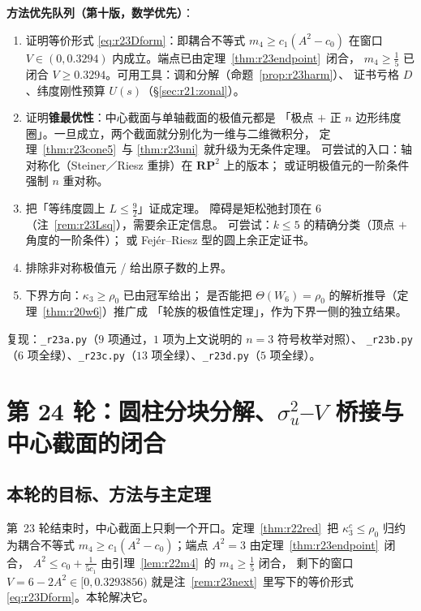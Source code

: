 \documentclass[UTF8,11pt]{ctexart}
\theoremstyle{definition}
\begin{document}
\textbf{方法优先队列（第十版，数学优先）}：
\begin{enumerate}\itemsep2pt
\item[\textbf{P1}] 证明等价形式 \eqref{eq:r23Dform}：即耦合不等式 $m_4\ge c_1(A^2-c_0)$
在窗口 $V\in(0,0.3294)$ 内成立。端点已由定理~\ref{thm:r23endpoint}~闭合，
$m_4\ge\frac15$ 已闭合 $V\ge0.3294$。可用工具：调和分解（命题~\ref{prop:r23harm}）、
证书亏格 $D$、纬度刚性预算 $U(s)$（\S\ref{sec:r21:zonal}）。
\item[\textbf{P2}] 证明\textbf{锥最优性}：中心截面与单轴截面的极值元都是
「极点 $+$ 正 $n$ 边形纬度圈」。一旦成立，两个截面就分别化为一维与二维微积分，
定理~\ref{thm:r23cone5}~与 \ref{thm:r23uni}~就升级为无条件定理。
可尝试的入口：轴对称化（Steiner／Riesz 重排）在 $\mathbf{RP}^2$ 上的版本；
或证明极值元的一阶条件强制 $n$ 重对称。
\item[\textbf{P3}] 把「等纬度圆上 $L\le\frac92$」证成定理。
障碍是矩松弛封顶在 $6$（注~\ref{rem:r23Lsq}），需要余正定信息。
可尝试：$k\le5$ 的精确分类（顶点 $+$ 角度的一阶条件）；
或 Fej\'er--Riesz 型的圆上余正定证书。
\item[\textbf{P4}] 排除非对称极值元 / 给出原子数的上界。
\item[\textbf{副}] 下界方向：$\kappa_3\ge\rho_0$ 已由冠军给出；
是否能把 $\Theta(W_6)=\rho_0$ 的解析推导（定理~\ref{thm:r20w6}）推广成
「轮族的极值性定理」，作为下界一侧的独立结果。
\end{enumerate}

复现：\texttt{\_r23a.py}（$9$ 项通过，$1$ 项为上文说明的 $n=3$ 符号枚举对照）、
\texttt{\_r23b.py}（$6$ 项全绿）、\texttt{\_r23c.py}（$13$ 项全绿）、\texttt{\_r23d.py}（$5$ 项全绿）。

\section{第 24 轮：圆柱分块分解、$\sigma_u^2$--$V$ 桥接与中心截面的闭合}\label{sec:r24}

\subsection{本轮的目标、方法与主定理}\label{sec:r24:intro}

第~23 轮结束时，中心截面上只剩一个开口。定理~\ref{thm:r22red}~把 $\kappa_3^c\le\rho_0$
归约为耦合不等式 $m_4\ge c_1(A^2-c_0)$；端点 $A^2=3$ 由定理~\ref{thm:r23endpoint}~闭合，
$A^2\le c_0+\frac1{5c_1}$ 由引理~\ref{lem:r22m4}~的 $m_4\ge\frac15$ 闭合，
剩下的窗口 $V=6-2A^2\in[0,0.3293856)$ 就是注~\ref{rem:r23next}~里写下的等价形式
\eqref{eq:r23Dform}。本轮解决它。
\end{document}
